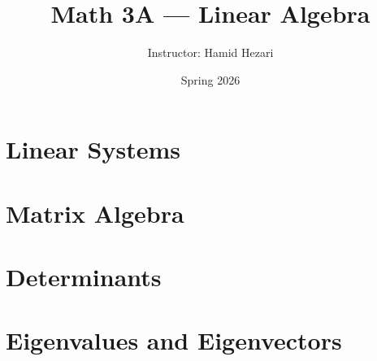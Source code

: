 \documentclass[11pt]{article}
\title{Math 3A --- Linear Algebra}
\author{Instructor: Hamid Hezari}
\date{Spring 2026}
\begin{document}
\maketitle
\tableofcontents
\newpage

\section{Linear Systems}


\section{Matrix Algebra}


\section{Determinants}


\section{Eigenvalues and Eigenvectors}

\end{document}
